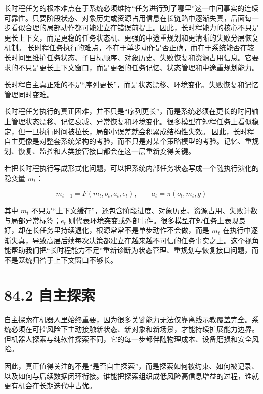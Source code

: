 长时程任务的根本难点在于系统必须维持“任务进行到了哪里”这一中间事实的连续可靠性。只要阶段状态、对象历史或资源占用信息在长链路中逐渐失真，后面每一步看似合理的局部动作都可能建立在错误前提上。因此，长时程能力的核心不只是更长上下文，而是更稳的任务状态机、更强的中途重规划和更清晰的失败分层恢复机制。 长时程任务执行的难点，不在于单步动作是否正确，而在于系统能否在较长时间里维护任务状态、子目标顺序、对象历史、失败恢复和资源占用信息。它要求的不只是更长上下文窗口，而是更强的任务记忆、状态管理和中途重规划能力。

长时程自主真正难的不是“序列更长”，而是状态漂移、环境变化、失败恢复和记忆管理同时变难。

长时程任务执行的真正困难，并不只是“序列更长”，而是系统必须在更长的时间轴上管理状态漂移、记忆衰减、异常恢复和环境变化。很多模型在短程任务上看似稳定，但一旦执行时间被拉长，局部小误差就会积累成结构性失效。 因此，长时程自主更像是对整套系统架构的考验，而不只是对某个策略模型的考验。记忆、重规划、恢复、监控和人类接管接口都会在这一层重新变得关键。

若把长时程执行写成形式化问题，可以把系统内部任务状态写成一个随执行演化的隐变量 \(m_t\)：

\begingroup
\footnotesize
\begin{equation*}
m_{t+1} = F(m_t, o_t, a_t, e_t), \qquad
a_t = \pi(o_t, m_t, g)
\end{equation*}
\endgroup

其中 \(m_t\) 不只是“上下文缓存”，还包含阶段进度、对象历史、资源占用、失败计数与局部异常标签；\(e_t\) 则代表环境突变或外部事件。很多模型在短任务上表现良好，却在长任务里持续退化，根源常常不是单步动作不会做，而是 \(m_t\) 在执行中逐渐失真，导致高层后续每次决策都建立在越来越不可信的任务事实之上。这个视角能帮助我们把“长时程能力不足”重新诊断为状态管理、重规划与恢复接口问题，而不是笼统归咎于上下文窗口不够长。

\section*{84.2 自主探索}


自主探索在机器人里始终重要，因为很多关键能力无法仅靠离线示教覆盖完全。系统必须在可控风险下主动接触新状态、新对象和新场景，才能持续扩展能力边界。但机器人探索与纯软件探索不同，它的每一步都伴随物理成本、设备磨损和安全风险。

因此，真正值得关注的不是“是否自主探索”，而是探索如何被约束、如何被记录、以及如何与后续数据闭环衔接。谁能把探索组织成低风险高信息增益的过程，谁就更有机会在长期迭代中占优。


